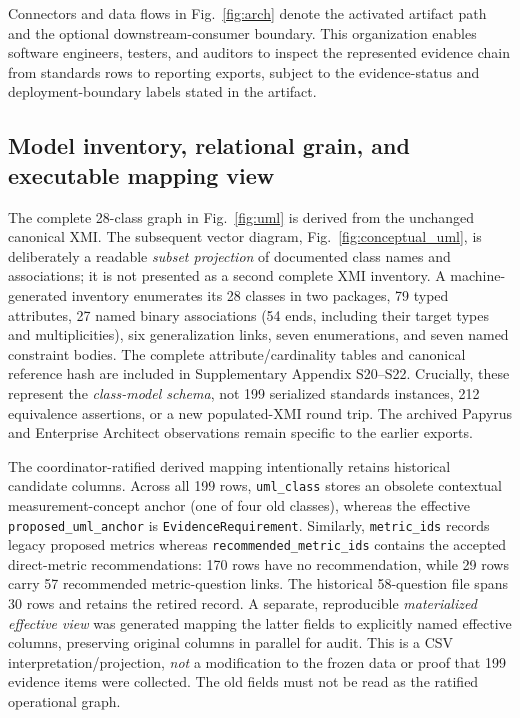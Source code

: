 \documentclass[12pt,a4paper]{article}
\begin{document}
Connectors and data flows in Fig.~\ref{fig:arch} denote the activated artifact path and the optional downstream-consumer boundary. This organization enables software engineers, testers, and auditors to inspect the represented evidence chain from standards rows to reporting exports, subject to the evidence-status and deployment-boundary labels stated in the artifact.

\subsection{Model inventory, relational grain, and executable mapping view}
\label{sec:model-inventory}
The complete 28-class graph in Fig.~\ref{fig:uml} is derived from the unchanged canonical XMI. The subsequent vector diagram, Fig.~\ref{fig:conceptual_uml}, is deliberately a readable \emph{subset projection} of documented class names and associations; it is not presented as a second complete XMI inventory. A machine-generated inventory enumerates its 28 classes in two packages, 79 typed attributes, 27 named binary associations (54 ends, including their target types and multiplicities), six generalization links, seven enumerations, and seven named constraint bodies. The complete attribute/cardinality tables and canonical reference hash are included in Supplementary Appendix S20--S22. Crucially, these represent the \emph{class-model schema}, not 199 serialized standards instances, 212 equivalence assertions, or a new populated-XMI round trip. The archived Papyrus and Enterprise Architect observations remain specific to the earlier exports.

The coordinator-ratified derived mapping intentionally retains historical candidate columns. Across all 199 rows, \texttt{uml\_class} stores an obsolete contextual measurement-concept anchor (one of four old classes), whereas the effective \texttt{proposed\_uml\_anchor} is \texttt{EvidenceRequirement}. Similarly, \texttt{metric\_ids} records legacy proposed metrics whereas \texttt{recommended\_metric\_ids} contains the accepted direct-metric recommendations: 170 rows have no recommendation, while 29 rows carry 57 recommended metric-question links. The historical 58-question file spans 30 rows and retains the retired record. A separate, reproducible \emph{materialized effective view} was generated mapping the latter fields to explicitly named effective columns, preserving original columns in parallel for audit. This is a CSV interpretation/projection, \emph{not} a modification to the frozen data or proof that 199 evidence items were collected. The old fields must not be read as the ratified operational graph.
\end{document}
